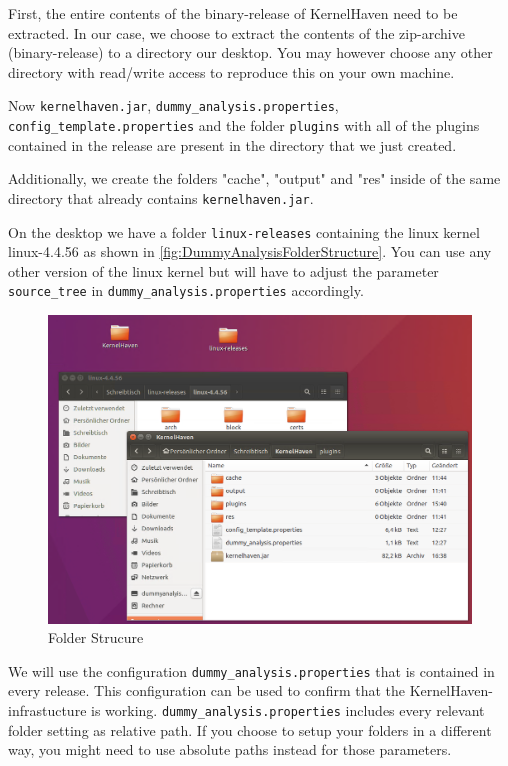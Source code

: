 First, the entire contents of the binary-release of KernelHaven need to be extracted. In our case, we choose to extract the contents of the zip-archive (binary-release) to a directory our desktop. You may however choose any other directory with read/write access to reproduce this on your own machine.

Now \texttt{kernelhaven.jar}, \texttt{dummy\_analysis.properties}, \texttt{config\_template.properties} and the folder  \texttt{plugins} with all of the plugins contained in the release are present in the directory that we just created.

Additionally, we create the folders "cache", "output" and "res" inside of the same directory that already contains \texttt{kernelhaven.jar}.

On the desktop we have a folder \texttt{linux-releases} containing the linux kernel  linux-4.4.56 as shown in \autoref{fig:DummyAnalysisFolderStructure}. You can use any other version of the linux kernel but will have to adjust the parameter \texttt{source\_tree} in \texttt{dummy\_analysis.properties} accordingly.

\begin{figure}[h!] 
  \centering
  \begin{minipage}[b]{1\textwidth} 
    \caption{Folder Strucure}\label{fig:DummyAnalysisFolderStructure}
    \includegraphics[width=1\textwidth]{Bilder/DummyAnalysisFolderStructure.png}
  \end{minipage}
\end{figure}


We will use the configuration \texttt{dummy\_analysis.properties} that is contained in every release. This configuration can be used to confirm that the KernelHaven-infrastucture is working.  \texttt{dummy\_analysis.properties} includes every relevant folder setting as relative path. If you choose to setup your folders in a different way, you might need to use absolute paths instead for those parameters.

